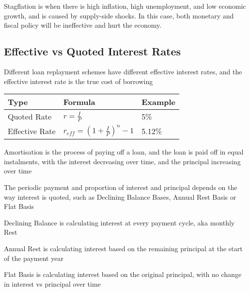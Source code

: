 Stagflation is when there is high inflation, high unemployment, and low economic growth, and is caused by supply-side shocks. In this case,
both monetary and fiscal policy will be ineffective and hurt the economy.

\subsection{Effective vs Quoted Interest Rates}
Different loan replayment schemes have different effective interest rates, and the effective interest rate is the true cost of borrowing


\begin{tabularx}{\linewidth}{X X X}
\toprule
\textbf{Type} & \textbf{Formula} & \textbf{Example} \\
\midrule
Quoted Rate & $r = \frac{I}{P}$ & 5\% \\
\midrule
Effective Rate & $r_{eff} = (1 + \frac{I}{P})^n - 1$ & 5.12\% \\
\bottomrule
\end{tabularx}

Amortisation is the process of paying off a loan, and the loan is paid off in equal instalments, with the interest decreasing over time, and the principal increasing over time

The periodic payment and proportion of interest and principal depends on the way interest is quoted, such as Declining Balance Bases, Annual Rest Basis or Flat Basis

Declining Balance is calculating interest at every payment cycle, aka monthly Rest

Annual Rest is calculating interest based on the remaining principal at the start of the payment year

Flat Basis is calculating interest based on the original principal, with no change in interest vs principal over time

